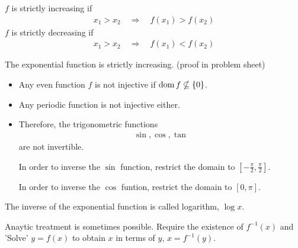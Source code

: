 \begin{df}
$f$ is strictly increasing if
\begin{align*}
x_1 > x_2 \quad \Rightarrow \quad f(x_1) > f(x_2)
\end{align*}
$f$ is strictly decreasing if
\begin{align*}
x_1 > x_2 \quad \Rightarrow \quad f(x_1) < f(x_2)
\end{align*}
\end{df}
\begin{ex}
 The exponential function is strictly increasing. (proof in problem sheet) 
\end{ex}
\begin{rk}\mbox \\
 \begin{itemize} 
 \item
 Any even function $f$ is not injective if $\operatorname{dom} f \nsubseteq \{0\}$.
 \item
 Any periodic function is not injective either.
 \item
Therefore, the trigonometric functions
\begin{align*}
\sin, \cos, \tan
\end{align*}
are not invertible.

In order to inverse the $\sin$ function, restrict the domain to $\left[-\frac \pi 2, \frac \pi 2\right]$.

In order to inverse the $\cos$ funtion, restrict the domain to $[0, \pi]$.
\end{itemize}
\end{rk}
The inverse of the exponential function is called logarithm, $\log x$.

Anaytic treatment is sometimes possible. Require the existence of $f^{-1}(x)$ and 'Solve' $y=f(x)$ to obtain $x$ in terms of $y$, $x=f^{-1}(y)$.

